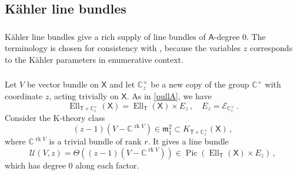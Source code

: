 \documentclass[14pt]{extarticle}
\newcommand{\C}{\mathbb{C}}
\newcommand{\Ct}{\mathbb{C}^\times}
\newcommand{\bT}{\mathsf{T}}
\newcommand{\bA}{\mathsf{A}}
\newcommand{\bX}{\mathsf{X}}
\newcommand{\cL}{\mathscr{L}}
\newcommand{\cU}{\mathscr{U}}
\newcommand{\cE}{\mathscr{E}}
\newcommand{\fAttr}{\Attr^f}
\newcommand{\forp}{\mathsf{p}}
\newcommand{\fmo}{\mathfrak{m}_1}
\newcommand{\Stab}{\mathsf{Stab}}
\newcommand{\Attr}{\mathsf{Attr}}
\DeclareMathOperator{\Ell}{Ell}
\DeclareMathOperator{\rk}{rk}
\DeclareMathOperator{\Pic}{Pic}
\theoremstyle{definition}
\begin{document}




\subsection{K\"ahler line bundles} \label{s_Kah}

\subsubsection{} 

K\"ahler line bundles give a rich supply of line bundles of
$\bA$-degree $0$. The terminology is chosen for consistency with \cite{ese}, because the variables
$z$ corresponds to the K\"ahler parameters in enumerative
context.

\subsubsection{} 

Let $V$ be vector bundle on $\bX$ and let $\Ct_z$ be a new copy of the
group $\Ct$ with coordinate $z$, acting trivially on $\bX$. As in
\eqref{pullA}, we have 
%
\begin{equation}
  \label{eq:3}
  \Ell_{\bT \times \Ct_z}(\bX) = \Ell_{\bT}(\bX) \times E_z\,, \quad
  E_z=\cE_{\Ct_z}\,. 
\end{equation}
%
{} Consider the K-theory class
$$
(z-1)(V-\C^{\rk V}) \in \fmo^2 \subset K_{\bT \times
  \Ct_z}(\bX)\,, 
$$
where $\C^{\rk V}$ is a trivial bundle of rank $r$.
It gives a line bundle 
%
\begin{equation}
\cU(V,z) = \Theta((z-1)(V-\C^{\rk V})) \in \Pic(\Ell_{\bT}(\bX) \times E_z)
\, , \label{defcU}
\end{equation}
%
which has degree $0$ along each factor. 
\end{document}
